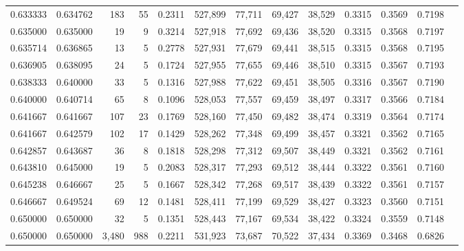 \begin{tabular}{rrrrrrrrrrrrr}
0.633333 & 0.634762 &    183 &     55 &                                     0.2311 & 527,899 &  77,711 &  69,427 &  38,529 & 0.3315 & 0.3569 & 0.7198 \\
0.635000 & 0.635000 &     19 &      9 &                                     0.3214 & 527,918 &  77,692 &  69,436 &  38,520 & 0.3315 & 0.3568 & 0.7197 \\
0.635714 & 0.636865 &     13 &      5 &                                     0.2778 & 527,931 &  77,679 &  69,441 &  38,515 & 0.3315 & 0.3568 & 0.7195 \\
0.636905 & 0.638095 &     24 &      5 &                                     0.1724 & 527,955 &  77,655 &  69,446 &  38,510 & 0.3315 & 0.3567 & 0.7193 \\
0.638333 & 0.640000 &     33 &      5 &                                     0.1316 & 527,988 &  77,622 &  69,451 &  38,505 & 0.3316 & 0.3567 & 0.7190 \\
0.640000 & 0.640714 &     65 &      8 &                                     0.1096 & 528,053 &  77,557 &  69,459 &  38,497 & 0.3317 & 0.3566 & 0.7184 \\
0.641667 & 0.641667 &    107 &     23 &                                     0.1769 & 528,160 &  77,450 &  69,482 &  38,474 & 0.3319 & 0.3564 & 0.7174 \\
0.641667 & 0.642579 &    102 &     17 &                                     0.1429 & 528,262 &  77,348 &  69,499 &  38,457 & 0.3321 & 0.3562 & 0.7165 \\
0.642857 & 0.643687 &     36 &      8 &                                     0.1818 & 528,298 &  77,312 &  69,507 &  38,449 & 0.3321 & 0.3562 & 0.7161 \\
0.643810 & 0.645000 &     19 &      5 &                                     0.2083 & 528,317 &  77,293 &  69,512 &  38,444 & 0.3322 & 0.3561 & 0.7160 \\
0.645238 & 0.646667 &     25 &      5 &                                     0.1667 & 528,342 &  77,268 &  69,517 &  38,439 & 0.3322 & 0.3561 & 0.7157 \\
0.646667 & 0.649524 &     69 &     12 &                                     0.1481 & 528,411 &  77,199 &  69,529 &  38,427 & 0.3323 & 0.3560 & 0.7151 \\
0.650000 & 0.650000 &     32 &      5 &                                     0.1351 & 528,443 &  77,167 &  69,534 &  38,422 & 0.3324 & 0.3559 & 0.7148 \\
0.650000 & 0.650000 &  3,480 &    988 &                                     0.2211 & 531,923 &  73,687 &  70,522 &  37,434 & 0.3369 & 0.3468 & 0.6826 \\

\end{tabular}
